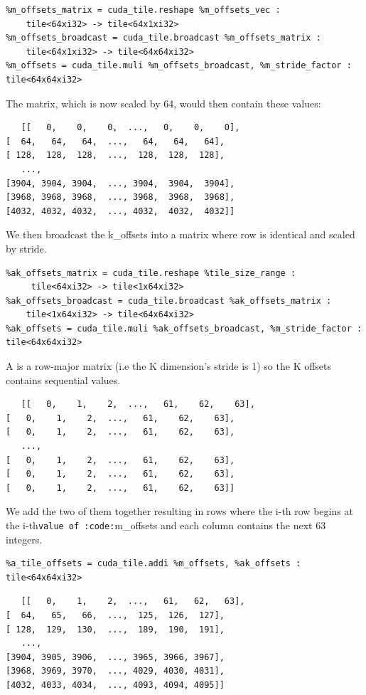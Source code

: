 \documentclass{article}
\begin{document}
\begin{lstlisting}
%m_offsets_matrix = cuda_tile.reshape %m_offsets_vec :
    tile<64xi32> -> tile<64x1xi32>
%m_offsets_broadcast = cuda_tile.broadcast %m_offsets_matrix :
    tile<64x1xi32> -> tile<64x64xi32>
%m_offsets = cuda_tile.muli %m_offsets_broadcast, %m_stride_factor : tile<64x64xi32>
\end{lstlisting}

The matrix, which is now scaled by 64, would then contain these values:


\begin{lstlisting}
   [[   0,    0,    0,  ...,   0,    0,    0],
[  64,   64,   64,  ...,   64,   64,   64],
[ 128,  128,  128,  ...,  128,  128,  128],
   ...,
[3904, 3904, 3904,  ..., 3904,  3904,  3904],
[3968, 3968, 3968,  ..., 3968,  3968,  3968],
[4032, 4032, 4032,  ..., 4032,  4032,  4032]]
\end{lstlisting}

We then broadcast the k\_offsets into a matrix where row is identical and scaled by stride.


\begin{lstlisting}
%ak_offsets_matrix = cuda_tile.reshape %tile_size_range :
     tile<64xi32> -> tile<1x64xi32>
%ak_offsets_broadcast = cuda_tile.broadcast %ak_offsets_matrix :
    tile<1x64xi32> -> tile<64x64xi32>
%ak_offsets = cuda_tile.muli %ak_offsets_broadcast, %m_stride_factor : tile<64x64xi32>
\end{lstlisting}

A is a row-major matrix (i.e the K dimension's stride is 1) so the K offsets contains sequential values.


\begin{lstlisting}
   [[   0,    1,    2,  ...,   61,    62,    63],
[   0,    1,    2,  ...,   61,    62,    63],
[   0,    1,    2,  ...,   61,    62,    63],
   ...,
[   0,    1,    2,  ...,   61,    62,    63],
[   0,    1,    2,  ...,   61,    62,    63],
[   0,    1,    2,  ...,   61,    62,    63]]
\end{lstlisting}

We add the two of them together resulting in rows where the i-th row begins at the i-th\texttt{value of :code:}m\_offsets and each column contains the next 63 integers.


\begin{lstlisting}
%a_tile_offsets = cuda_tile.addi %m_offsets, %ak_offsets : tile<64x64xi32>
\end{lstlisting}

\begin{lstlisting}
   [[   0,    1,    2,  ...,   61,   62,   63],
[  64,   65,   66,  ...,  125,  126,  127],
[ 128,  129,  130,  ...,  189,  190,  191],
   ...,
[3904, 3905, 3906,  ..., 3965, 3966, 3967],
[3968, 3969, 3970,  ..., 4029, 4030, 4031],
[4032, 4033, 4034,  ..., 4093, 4094, 4095]]
\end{lstlisting}
\end{document}

